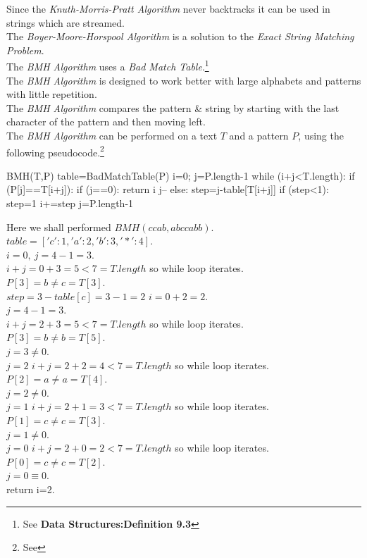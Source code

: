 \documentclass[11pt,a4paper]{article}
\begin{document}
Since the \textit{Knuth-Morris-Pratt Algorithm} never backtracks it can be used in strings which are streamed.\\

\newpage
{}
The \textit{Boyer-Moore-Horspool Algorithm} is a solution to the \textit{Exact String Matching Problem}.\\
The \textit{BMH Algorithm} uses a \textit{Bad Match Table}.\footnote{See \textbf{Data Structures:Definition 9.3}}\\
The \textit{BMH Algorithm} is designed to work better with large alphabets and patterns with little repetition.\\
The \textit{BMH Algorithm} compares the pattern \& string by starting with the last character of the pattern and then moving left.\\
The \textit{BMH Algorithm} can be performed on a text $T$ and a pattern $P$, using the following pseudocode.\footnote{See {}}
\begin{code}
BMH(T,P)
table=BadMatchTable(P)
i=0; j=P.length-1
while (i+j<T.length):
  if (P[j]==T[i+j]):
    if (j==0):
      return i
    j--
  else:
    step=j-table[T[i+j]]
    if (step<1):
      step=1
    i+=step
    j=P.length-1
\end{code}

Here we shall performed $BMH(ccab,abccabb)$.\\
$table=['c':1,'a':2,'b':3,'*':4]$.\\
$i=0,\ j=4-1=3$.\\
$i+j=0+3=5<7=T.length$ so while loop iterates.\\
$P[3]=b\neq c=T[3]$.\\
$step=3-table[c]=3-1=2$
$i=0+2=2$.\\
$j=4-1=3$.\\
$i+j=2+3=5<7=T.length$ so while loop iterates.\\
$P[3]=b\neq b=T[5]$.\\
$j=3\neq0$.\\
$j=2$
$i+j=2+2=4<7=T.length$ so while loop iterates.\\
$P[2]=a\neq a=T[4]$.\\
$j=2\neq0$.\\
$j=1$
$i+j=2+1=3<7=T.length$ so while loop iterates.\\
$P[1]=c\neq c=T[3]$.\\
$j=1\neq0$.\\
$j=0$
$i+j=2+0=2<7=T.length$ so while loop iterates.\\
$P[0]=c\neq c=T[2]$.\\
$j=0\equiv0$.\\
return i=2.\\
\end{document}
